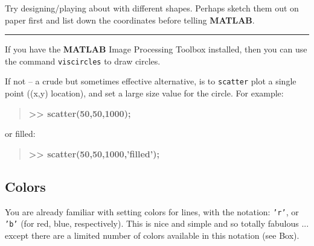 \documentclass{tufte-book} %
\newenvironment{docspecbold}{\begin{quotation}\ttfamily\bfseries\parskip0pt\parindent0pt\ignorespaces}{\end{quotation}}
\begin{document}
Try designing/playing about with different shapes. Perhaps sketch them out on paper first and list down the coordinates before telling \textbf{MATLAB}.

\vspace{1mm}
\noindent\rule{4cm}{0.5pt}
\vspace{2mm}

\noindent If you have the \textbf{MATLAB} \textsf{Image Processing Toolbox} installed, then you can use the command \texttt{viscircles} to draw circles.

If not -- a crude but sometimes effective alternative, is to \texttt{scatter} plot a single point ((x,y) location), and set a large size value for the circle. For example:
\begin{docspecbold}
>> scatter(50,50,1000);
\end{docspecbold}
or filled:
\begin{docspecbold}
>> scatter(50,50,1000,'filled');
\end{docspecbold}


\subsection{Colors}

You are already familiar with setting colors for lines, with the notation: \texttt{'r'}, or \texttt{'b'} (for red, blue, respectively). This is nice and simple and so totally fabulous ... except there are a limited number of colors available in this notation (see Box).

\end{document}
